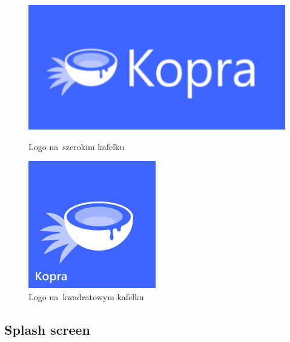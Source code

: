 \documentclass[a4paper,twoside,titlepage,openright]{book}
\begin{document}
\begin{figure}[h]
	\centering
	\begin{minipage}[b]{0.3\textwidth}
		\includegraphics[width=\textwidth]{kafelekSzeroki.png}
		\caption{Logo na~szerokim kafelku}
		\label{fig:logoSzerokie}
	\end{minipage}
\hspace*{60px}
	\begin{minipage}[b]{0.3\textwidth}
		\includegraphics[width=\textwidth]{kafelekKwadratowy.png}
		\caption{Logo na~kwadratowym kafelku}
		\label{fig:logoKwadratowe}
	\end{minipage}
	\hfill
\end{figure}


\subsection{Splash screen}
\end{document}
